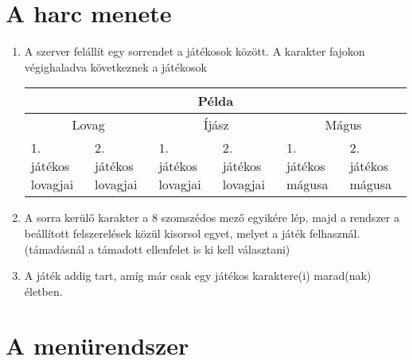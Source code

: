 \section{A harc menete}
\begin{enumerate}
\item A szerver felállít egy sorrendet a játékosok között. A karakter fajokon végighaladva következnek a játékosok

\newcommand{\owntabnr}{4cm}
\newcommand{\colwid}{\textwidth-\owntabnr)/6}
\begin{tabular}{ |p{(\colwid}|p{(\colwid}|p{(\colwid}|p{(\colwid}|p{(\colwid}|p{(\colwid}|  }
	\hline
	\multicolumn{6}{|c|}{Példa} \\
	\hline
	\multicolumn{2}{|c|}{Lovag}& \multicolumn{2}{|c|}{Íjász} & \multicolumn{2}{|c|}{Mágus} \\
	\hline
	1. játékos lovagjai & 2. játékos lovagjai & 1. játékos lovagjai & 2. játékos lovagjai  & 1. játékos mágusa & 2. játékos mágusa \\
	\hline
\end{tabular}
\item A sorra kerülő karakter a 8 szomszédos mező egyikére lép, majd a rendszer a beállított felszerelések közül kisorsol egyet, melyet a játék felhasznál. (támadásnál a támadott ellenfelet is ki kell választani)
\item A játék addig tart, amíg már csak egy játékos karaktere(i) marad(nak) életben.
\end{enumerate}


\section{A menürendszer}


